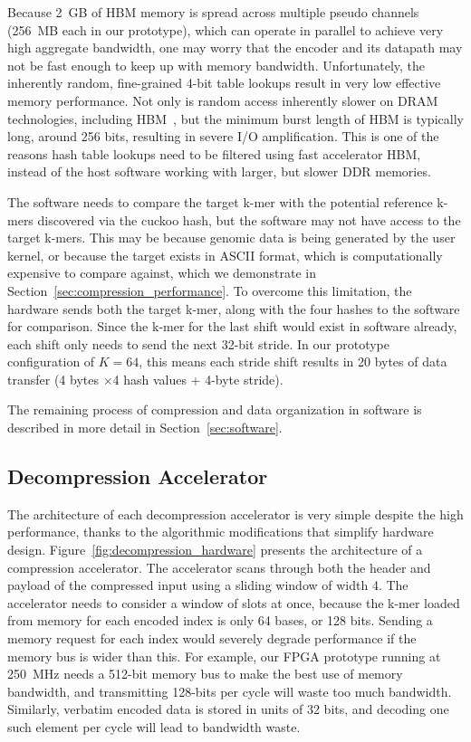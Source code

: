 Because 2~GB of HBM memory is spread across multiple pseudo channels (256~MB each in our prototype), which can operate in parallel to achieve very high aggregate bandwidth, one may worry that the encoder and its datapath may not be fast enough to keep up with memory bandwidth.
Unfortunately, the inherently random, fine-grained 4-bit table lookups result in very low effective memory performance.
Not only is random access inherently slower on DRAM technologies, including HBM~\cite{hbm_xilinx}, but the minimum burst length of HBM is typically long, around 256 bits, resulting in severe I/O amplification.
This is one of the reasons hash table lookups need to be filtered using fast accelerator HBM, instead of the host software working with larger, but slower DDR memories.

The software needs to compare the target k-mer with the potential reference k-mers discovered via the cuckoo hash, but the software may not have access to the target k-mers.
This may be because genomic data is being generated by the user kernel, or because the target exists in ASCII format, which is computationally expensive to compare against, which we demonstrate in Section~\ref{sec:compression_performance}.
To overcome this limitation, the hardware sends both the target k-mer, along with the four hashes to the software for comparison.
Since the k-mer for the last shift would exist in software already, each shift only needs to send the next 32-bit stride.
In our prototype configuration of $K=64$, this means each stride shift results in 20 bytes of data transfer (4 bytes $\times$4 hash values + 4-byte stride).

The remaining process of compression and data organization in software is described in more detail in Section~\ref{sec:software}.


\subsection{Decompression Accelerator}
\label{sec:decompression_arch}

The architecture of each decompression accelerator is very simple despite the high performance, thanks to the algorithmic modifications that simplify hardware design.
Figure~\ref{fig:decompression_hardware} presents the architecture of a compression accelerator.
The accelerator scans through both the header and payload of the compressed input using a sliding window of width 4.
The accelerator needs to consider a window of slots at once, because the k-mer loaded from memory for each encoded index is only 64 bases, or 128 bits.
Sending a memory request for each index would severely degrade performance if the memory bus is wider than this.
For example, our FPGA prototype running at 250~MHz needs a 512-bit memory bus to make the best use of memory bandwidth, and transmitting 128-bits per cycle will waste too much bandwidth.
Similarly, verbatim encoded data is stored in units of 32 bits, and decoding one such element per cycle will lead to bandwidth waste.

